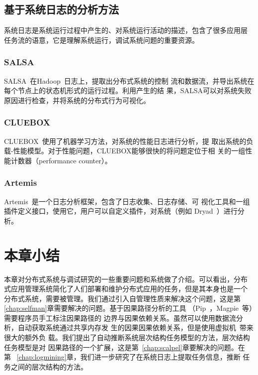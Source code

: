 \subsection{基于系统日志的分析方法}
\label{related:debug:log}


系统日志是系统运行过程中产生的、对系统运行活动的描述，包含了很多应用层
任务流的语意，它是理解系统运行，调试系统问题的重要资源。

\subsubsection*{SALSA}

SALSA~\cite{salsa}在Hadoop~\cite{hadoop}日志上，提取出分布式系统的控制
流和数据流，并导出系统在每个节点上的状态机形式的运行过程。利用产生的结
果，SALSA可以对系统失败原因进行检查，并将系统的分布式行为可视化。

\subsubsection*{CLUEBOX}

CLUEBOX~\cite{cluebox}使用了机器学习方法，对系统的性能日志进行分析，提
取出系统的负载-性能模型。对于性能问题，CLUEBOX能够很快的将问题定位于相
关的一组性能计数器（performance counter）。

\subsubsection*{Artemis}

Artemis~\cite{artemis}是一个日志分析框架，包含了日志收集、日志存储、可
视化工具和一组插件定义接口，使用它，用户可以自定义插件，对系统（例如
Dryad~\cite{dryad}）进行分析。

\section{本章小结}

本章对分布式系统与调试研究的一些重要问题和系统做了介绍。可以看出，分布
式应用管理系统简化了人们部署和维护分布式应用的任务，但是其本身也是一个
分布式系统，需要被管理。我们通过引入自管理性质来解决这个问题，这是第~
\ref{chap:selfman}章需要解决的问题。基于因果路径分析的工具
（Pip~\cite{pip}，Magpie~\cite{magpie}等）需要程序员手工标注因果路径的
边界与因果依赖关系。虽然可以使用数据流分析，自动获取系统通过共享内存发
生的因果因果依赖关系，但是使用虚拟机~\cite{qemu}带来很大的额外负
载。我们提出了自动推断系统层次结构任务模型的方法，层次结构任务模型是对
因果路径的一个扩展，这是第~\ref{chap:scalpel}章要解决的问题。在第~
\ref{chap:logmining}章，我们进一步研究了在系统日志上提取任务信息，推断
任务之间的层次结构的方法。
